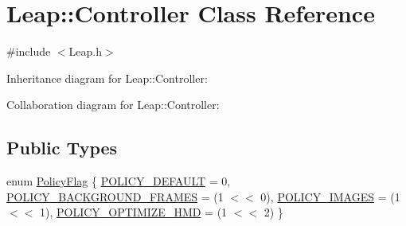 \hypertarget{class_leap_1_1_controller}{}\section{Leap\+:\+:Controller Class Reference}
\label{class_leap_1_1_controller}


{\ttfamily \#include $<$Leap.\+h$>$}



Inheritance diagram for Leap\+:\+:Controller\+:


Collaboration diagram for Leap\+:\+:Controller\+:
\subsection*{Public Types}
\begin{DoxyCompactItemize}
\item 
enum \hyperlink{class_leap_1_1_controller_a0bdb49fa94aa2da8b098c1ac296528d6}{Policy\+Flag} \{ \hyperlink{class_leap_1_1_controller_a0bdb49fa94aa2da8b098c1ac296528d6a94886192cfa6f6f94cd2e20b68aeca97}{P\+O\+L\+I\+C\+Y\+\_\+\+D\+E\+F\+A\+U\+LT} = 0, 
\hyperlink{class_leap_1_1_controller_a0bdb49fa94aa2da8b098c1ac296528d6a1e34f1992444deee3b4c905d2a765329}{P\+O\+L\+I\+C\+Y\+\_\+\+B\+A\+C\+K\+G\+R\+O\+U\+N\+D\+\_\+\+F\+R\+A\+M\+ES} = (1 $<$$<$ 0), 
\hyperlink{class_leap_1_1_controller_a0bdb49fa94aa2da8b098c1ac296528d6a47ff38f668d865a4fd556ee089653721}{P\+O\+L\+I\+C\+Y\+\_\+\+I\+M\+A\+G\+ES} = (1 $<$$<$ 1), 
\hyperlink{class_leap_1_1_controller_a0bdb49fa94aa2da8b098c1ac296528d6a5688b86ae42d6f2a6e4770b8ce7466b7}{P\+O\+L\+I\+C\+Y\+\_\+\+O\+P\+T\+I\+M\+I\+Z\+E\+\_\+\+H\+MD} = (1 $<$$<$ 2)
 \}
\end{DoxyCompactItemize}
